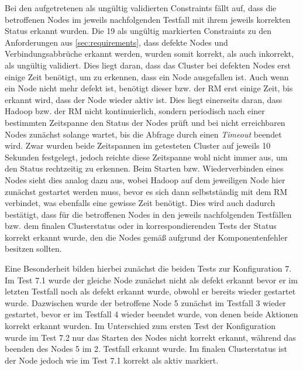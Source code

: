 Bei den aufgetretenen als ungültig validierten Constraints fällt auf, dass die betroffenen Nodes im jeweils nachfolgenden Testfall mit ihrem jeweils korrekten Status erkannt wurden.
Die 19 als ungültig markierten Constraints zu den Anforderungen aus \cref{sec:requirements}, dass defekte Nodes und Verbindungsabbrüche erkannt werden, wurden somit korrekt, als auch inkorrekt, als ungültig validiert.
Dies liegt daran, dass das Cluster bei defekten Nodes erst einige Zeit benötigt, um zu erkennen, dass ein Node ausgefallen ist.
Auch wenn ein Node nicht mehr defekt ist, benötigt dieser bzw. der \ac{RM} erst einige Zeit, bis erkannt wird, dass der Node wieder aktiv ist.
Dies liegt einerseits daran, dass Hadoop bzw. der \ac{RM} nicht kontinuierlich, sondern periodisch nach einer bestimmten Zeitspanne den Status der Nodes prüft und bei nicht erreichbaren Nodes zunächst solange wartet, bis die Abfrage durch einen \emph{Timeout} beendet wird.
Zwar wurden beide Zeitspannen im getesteten Cluster auf jeweils 10 Sekunden festgelegt, jedoch reichte diese Zeitspanne wohl nicht immer aus, um den Status rechtzeitig zu erkennen.
Beim Starten bzw. Wiederverbinden eines Nodes sieht dies analog dazu aus, wobei Hadoop auf dem jeweiligen Node hier zunächst gestartet werden muss, bevor es sich dann selbstständig mit dem \ac{RM} verbindet, was ebenfalls eine gewisse Zeit benötigt.
Dies wird auch dadurch bestätigt, dass für die betroffenen Nodes in den jeweils nachfolgenden Testfällen bzw. dem finalen Clusterstatus oder in korrespondierenden Tests der Status korrekt erkannt wurde, den die Nodes gemäß aufgrund der Komponentenfehler besitzen sollten.

Eine Besonderheit bilden hierbei zunächst die beiden Tests zur Konfiguration 7.
Im Test 7.1 wurde der gleiche Node zunächst nicht als defekt erkannt bevor er im letzten Testfall noch als defekt erkannt wurde, obwohl er bereits wieder gestartet wurde.
Dazwischen wurde der betroffene Node 5 zunächst im Testfall 3 wieder gestartet, bevor er im Testfall 4 wieder beendet wurde, von denen beide Aktionen korrekt erkannt wurden.
Im Unterschied zum ersten Test der Konfiguration wurde im Test 7.2 nur das Starten des Nodes nicht korrekt erkannt, während das beenden des Nodes 5 im 2. Testfall erkannt wurde.
Im finalen Clusterstatus ist der Node jedoch wie im Test 7.1 korrekt als aktiv markiert.

